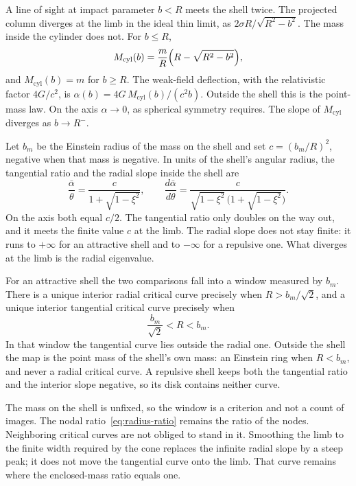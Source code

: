 \documentclass[a4paper]{article}
\begin{document}
A line of sight at impact parameter \(b<R\) meets the shell twice. The projected column diverges at the limb in the ideal thin limit, as \(2\sigma R/\sqrt{R^2-b^2}\). The mass inside the cylinder does not. For \(b\le R\),
\begin{equation}
\label{eq:mcyl}
M_{\mathrm{cyl}}(b)=\frac{m}{R}\Bigl(R-\sqrt{R^2-b^2}\Bigr),
\end{equation}
and \(M_{\mathrm{cyl}}(b)=m\) for \(b\ge R\). The weak-field deflection, with the relativistic factor \(4G/c^2\), is \(\alpha(b)=4G\,M_{\mathrm{cyl}}(b)/(c^2 b)\). Outside the shell this is the point-mass law. On the axis \(\alpha\to 0\), as spherical symmetry requires. The slope of \(M_{\mathrm{cyl}}\) diverges as \(b\to R^-\).

Let \(b_m\) be the Einstein radius of the mass on the shell and set \(c=(b_m/R)^2\), negative when that mass is negative. In units of the shell's angular radius, the tangential ratio and the radial slope inside the shell are
\begin{equation}
\label{eq:shell-profiles}
\frac{\bar\alpha}{\theta}=\frac{c}{1+\sqrt{1-\xi^2}},
\qquad
\frac{d\bar\alpha}{d\theta}
  =\frac{c}{\sqrt{1-\xi^2}\,\bigl(1+\sqrt{1-\xi^2}\bigr)}.
\end{equation}
On the axis both equal \(c/2\). The tangential ratio only doubles on the way out, and it meets the finite value \(c\) at the limb. The radial slope does not stay finite: it runs to \(+\infty\) for an attractive shell and to \(-\infty\) for a repulsive one. What diverges at the limb is the radial eigenvalue.

For an attractive shell the two comparisons fall into a window measured by \(b_m\). There is a unique interior radial critical curve precisely when \(R>b_m/\sqrt{2}\), and a unique interior tangential critical curve precisely when
\begin{equation}
\label{eq:shell-window}
\frac{b_m}{\sqrt{2}}<R<b_m.
\end{equation}
In that window the tangential curve lies outside the radial one. Outside the shell the map is the point mass of the shell's own mass: an Einstein ring when \(R<b_m\), and never a radial critical curve. A repulsive shell keeps both the tangential ratio and the interior slope negative, so its disk contains neither curve.

The mass on the shell is unfixed, so the window is a criterion and not a count of images. The nodal ratio~\eqref{eq:radius-ratio} remains the ratio of the nodes. Neighboring critical curves are not obliged to stand in it. Smoothing the limb to the finite width required by the cone replaces the infinite radial slope by a steep peak; it does not move the tangential curve onto the limb. That curve remains where the enclosed-mass ratio equals one.
\end{document}
